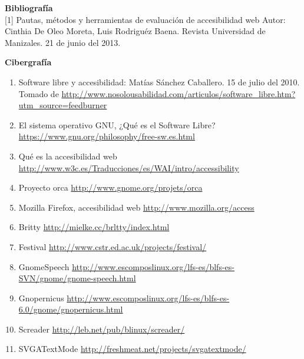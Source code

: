 \begin{multicols}{2}
\medskip


\begin{bibliografia}
\textbf{Bibliografía}\\

[1]  Pautas, métodos y herramientas de evaluación de accesibilidad web Autor: Cinthia De Oleo Moreta, Luis Rodriguéz Baena. Revista Universidad de Manizales. 21 de junio del 2013.

\end{bibliografia}

\textbf{Cibergrafía}

\begin{enumerate}

\item Software libre y accesibilidad: Matías Sánchez Caballero. 15 de julio del 2010. Tomado de  \url{http://www.nosolousabilidad.com/articulos/software_libre.htm?utm_source=feedburner}


\item El sistema operativo GNU, ¿Qué es el Software Libre? \url{https://www.gnu.org/philosophy/free-sw.es.html}

\item Qué es la accesibilidad web \url{http://www.w3c.es/Traducciones/es/WAI/intro/accessibility}

\item Proyecto orca \url{http://www.gnome.org/projets/orca}

\item Mozilla Firefox, accesibilidad web \url{http://www.mozilla.org/access}

\item Britty \url{http://mielke.cc/brltty/index.html}

\item Festival \url{http://www.cstr.ed.ac.uk/projects/festival/}

\item GnomeSpeech \url{http://www.escomposlinux.org/lfs-es/blfs-es-SVN/gnome/gnome-speech.html}

\item Gnopernicus \url{http://www.escomposlinux.org/lfs-es/blfs-es-6.0/gnome/gnopernicus.html}

\item Screader \url{http://leb.net/pub/blinux/screader/}

\item SVGATextMode \url{http://freshmeat.net/projects/svgatextmode/}


\end{enumerate}
\end{multicols}
